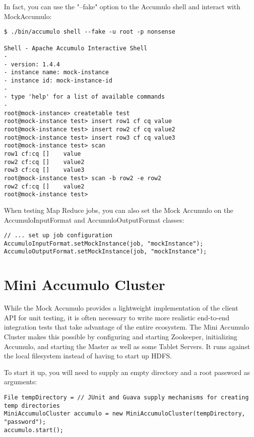 In fact, you can use the "--fake" option to the Accumulo shell and interact with
MockAccumulo:

\small
\begin{verbatim}
$ ./bin/accumulo shell --fake -u root -p nonsense

Shell - Apache Accumulo Interactive Shell
-
- version: 1.4.4
- instance name: mock-instance
- instance id: mock-instance-id
-
- type 'help' for a list of available commands
-
root@mock-instance> createtable test
root@mock-instance test> insert row1 cf cq value
root@mock-instance test> insert row2 cf cq value2
root@mock-instance test> insert row3 cf cq value3
root@mock-instance test> scan
row1 cf:cq []    value
row2 cf:cq []    value2
row3 cf:cq []    value3
root@mock-instance test> scan -b row2 -e row2
row2 cf:cq []    value2
root@mock-instance test>
\end{verbatim}
\normalsize

When testing Map Reduce jobs, you can also set the Mock Accumulo on the AccumuloInputFormat
and AccumuloOutputFormat classes:

\small
\begin{verbatim}
// ... set up job configuration
AccumuloInputFormat.setMockInstance(job, "mockInstance");
AccumuloOutputFormat.setMockInstance(job, "mockInstance");
\end{verbatim}
\normalsize

\section{Mini Accumulo Cluster}

While the Mock Accumulo provides a lightweight implementation of the client API for unit
testing, it is often necessary to write more realistic end-to-end integration tests that
take advantage of the entire ecosystem. The Mini Accumulo Cluster makes this possible by
configuring and starting Zookeeper, initializing Accumulo, and starting the Master as well
as some Tablet Servers. It runs against the local filesystem instead of having to start
up HDFS.

To start it up, you will need to supply an empty directory and a root password as arguments:

\small
\begin{verbatim}
File tempDirectory = // JUnit and Guava supply mechanisms for creating temp directories
MiniAccumuloCluster accumulo = new MiniAccumuloCluster(tempDirectory, "password");
accumulo.start();
\end{verbatim}
\normalsize

